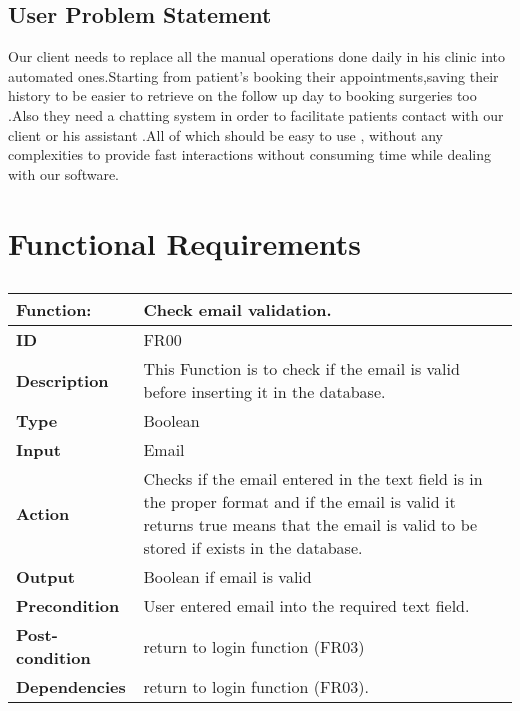 \documentclass[]{article}
\begin{document}
\subsection{ User Problem Statement}
Our client needs to replace all the manual operations done daily in his clinic into automated ones.Starting from patient's booking their appointments,saving their history to be easier to retrieve on the follow up day to booking surgeries too .Also they need a chatting system in order to facilitate patients contact with our client or his assistant .All of which should be easy to use , without any complexities to provide fast interactions without consuming time while dealing with our software.

\section{Functional Requirements}

\FloatBarrier
\begin{table}[h]
\caption{ }
\label{tab:my-table}
\begin{tabular}{|p{}|p{}|}
\hline
\textbf{Function:} & Check email validation.
\\ \hline
\textbf{ID}  &      FR00      

\\ \hline
\textbf{Description}    &    This Function is to check if the email is valid before inserting it in the database.                                                                 
\\ \hline
\textbf{Type}    &         Boolean

\\ \hline
\textbf{Input}        & Email


\\ \hline
\textbf{Action}            & Checks if the email entered in the text field  is in the proper format and  if the email is valid  it returns true means that the email is valid to be stored if exists in the database.

\\ \hline
\textbf{Output}            & Boolean if email is valid

\\ \hline
\textbf{Precondition}           &   User entered email into the required text field.

\\ \hline
\textbf{Post-condition}          & return to login function (FR03)  


\\ \hline
\textbf{Dependencies}           & return to login function (FR03).
\\ \hline
\end{tabular}
\end{table}
\end{document}
